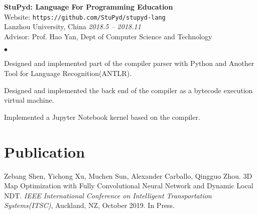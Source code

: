 \documentclass[margin,line,pifont,palatino,courier]{res}
\newenvironment{list2}{
	\begin{list}{$\bullet$}{%
			\setlength{\itemsep}{0in}
			\setlength{\parsep}{0in} \setlength{\parskip}{0in}
			\setlength{\topsep}{0in} \setlength{\partopsep}{0in}
			\setlength{\leftmargin}{0.2in}}}{\end{list}}
\begin{document}
\begin{resume}
		{\bf StuPyd: Language For Programming Education} \\
		Website: \verb+https://github.com/StuPyd/stupyd-lang+ \\
		Lanzhou University, China \hfill {\sl 2018.5 -- 2018.11} \\
		Advisor: Prof. Hao Yan, Dept of Computer Science and Technology 
		\begin{list2}
			\item Designed and implemented part of the compiler parser with Python and Another Tool for Language Recognition(ANTLR).
			\item Designed and implemented the back end of the compiler as a bytecode execution virtual machine.
			\item Implemented a Jupyter Notebook kernel based on the compiler. 
		\end{list2}	
		

		\section{\sc Publication}
			
			\begin{enumerate}[{[1]}]
				\item Zebang Shen, Yichong Xu, Muchen Sun, Alexander Carballo, Qingguo Zhou. 3D Map Optimization with Fully Convolutional Neural Network and Dynamic Local NDT. {\it IEEE International Conference on Intelligent Transportation Systems(ITSC)}, Auckland, NZ, October 2019. In Press.
			\end{enumerate}
		

\end{resume}
\end{document}
